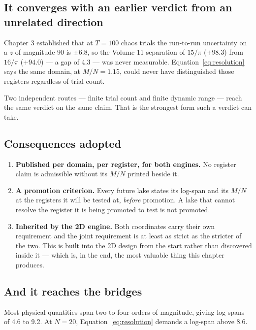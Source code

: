 \documentclass[11pt, letterpaper, openany]{book}
\begin{document}
\subsection{It converges with an earlier verdict from an unrelated direction}

Chapter 3 established that at $T = 100$ chaos trials the run-to-run uncertainty on a $z$ of
magnitude 90 is $\pm 6.8$, so the Volume 11 separation of $15/\pi$ ($+98.3$) from $16/\pi$
($+94.0$) --- a gap of 4.3 --- was never measurable. Equation~\ref{eq:resolution} says the same
domain, at $M/N = 1.15$, could never have distinguished those registers regardless of trial
count.

\begin{signalbox}
Two independent routes --- finite trial count and finite dynamic range --- reach the same
verdict on the same claim. That is the strongest form such a verdict can take.
\end{signalbox}

\subsection{Consequences adopted}

\begin{enumerate}
    \item \textbf{Published per domain, per register, for both engines.} No register claim is
          admissible without its $M/N$ printed beside it.
    \item \textbf{A promotion criterion.} Every future lake states its log-span and its $M/N$ at
          the registers it will be tested at, \emph{before} promotion. A lake that cannot resolve
          the register it is being promoted to test is not promoted.
    \item \textbf{Inherited by the 2D engine.} Both coordinates carry their own requirement and
          the joint requirement is at least as strict as the stricter of the two. This is built
          into the 2D design from the start rather than discovered inside it --- which is, in the
          end, the most valuable thing this chapter produces.
\end{enumerate}

\subsection{And it reaches the bridges}

Most physical quantities span two to four orders of magnitude, giving log-spans of 4.6 to 9.2.
At $N = 20$, Equation~\ref{eq:resolution} demands a log-span above 8.6.
\end{document}
